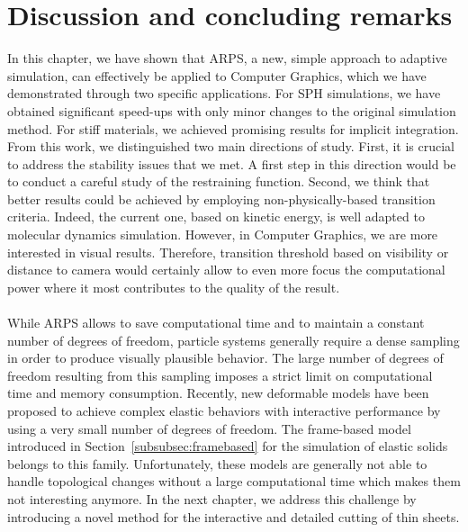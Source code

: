 \section{Discussion and concluding remarks} 
\label{sec:arps_discussion}
In this chapter, we have shown that ARPS, a new, simple approach to adaptive simulation, can effectively be applied to Computer Graphics, which we have demonstrated through two specific applications.
For SPH simulations, we have obtained significant speed-ups with only minor changes to the original simulation method.
For stiff materials, we achieved promising results for implicit integration.
From this work, we distinguished two main directions of study.
First, it is crucial to address the stability issues that we met. 
A first step in this direction would be to conduct a careful study of the restraining function.
Second, we think that better results could be achieved by employing non-physically-based transition criteria. 
Indeed, the current one, based on kinetic energy, is well adapted to molecular dynamics simulation. 
However, in Computer Graphics, we are more interested in visual results.
Therefore, transition threshold based on visibility or distance to camera would certainly allow to even more focus the computational power where it most contributes to the quality of the result.
\\ \\
While ARPS allows to save computational time and to maintain a constant number of degrees of freedom,
particle systems generally require a dense sampling in order to produce visually plausible behavior.
The large number of degrees of freedom resulting from this sampling imposes a strict limit on computational time and memory consumption.
Recently, new deformable models have been proposed to achieve complex elastic behaviors with interactive performance by using a very small number of degrees of freedom. 
The frame-based model introduced in Section~\ref{subsubsec:framebased} for the simulation of elastic solids belongs to this family.
Unfortunately, these models are generally not able to handle topological changes without a large computational time which makes them not interesting anymore.
In the next chapter, we address this challenge by introducing a novel method for the interactive and detailed cutting of thin sheets.
